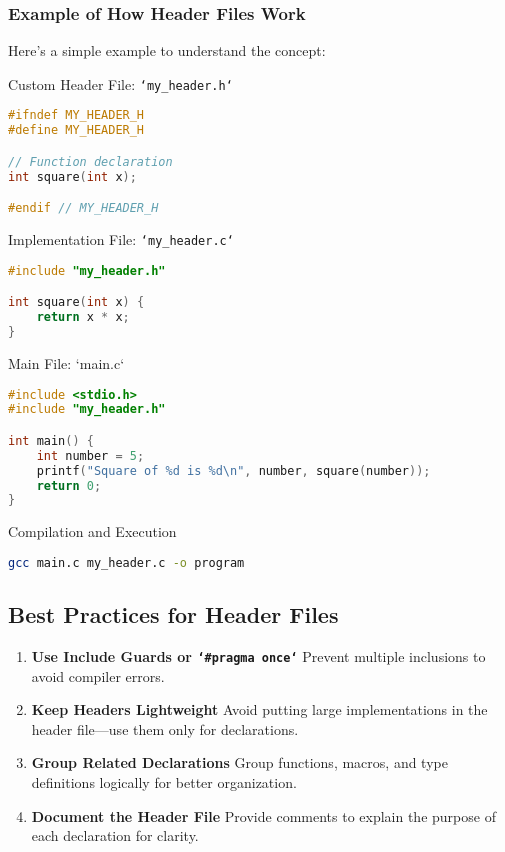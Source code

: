 \subsubsection{ Example of How Header Files Work}

Here’s a simple example to understand the concept:

 Custom Header File: \texttt{`my\_header.h`}

\begin{lstlisting}[caption=Example C++, label={lst:listing-cpp}, language=C++, style=myStyle]
#ifndef MY_HEADER_H
#define MY_HEADER_H

// Function declaration
int square(int x);

#endif // MY_HEADER_H
\end{lstlisting}


 Implementation File: \texttt{`my\_header.c`}

\begin{lstlisting}[caption=Example C++, label={lst:listing-cpp}, language=C++, style=myStyle]
#include "my_header.h"

int square(int x) {
	return x * x;
}
\end{lstlisting}

 Main File: `main.c`
\begin{lstlisting}[caption=Example C++, label={lst:listing-cpp}, language=C++, style=myStyle]
#include <stdio.h>
#include "my_header.h"

int main() {
	int number = 5;
	printf("Square of %d is %d\n", number, square(number));
	return 0;
}
\end{lstlisting}

 Compilation and Execution
\begin{lstlisting}[caption=Bash, label={lst:listing-cpp}, language=bash, style=myStyle]
gcc main.c my_header.c -o program
\end{lstlisting}

\subsection{ Best Practices for Header Files}

\begin{enumerate}
	\item\textbf{Use Include Guards or \texttt{`\#pragma once`}} Prevent multiple inclusions to avoid compiler errors.
	\item\textbf{Keep Headers Lightweight} Avoid putting large implementations in the header file—use them only for declarations.
	\item\textbf{Group Related Declarations} Group functions, macros, and type definitions logically for better organization.
	\item\textbf{Document the Header File} Provide comments to explain the purpose of each declaration for clarity.
\end{enumerate}

